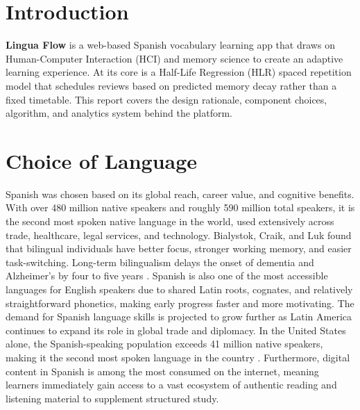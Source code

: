 \documentclass[10pt,a4paper]{article}
\begin{document}
\newpage
\tableofcontents
\newpage

\section{Introduction}
\textbf{Lingua Flow} is a web-based Spanish vocabulary learning app that draws on Human-Computer Interaction (HCI) and memory science to create an adaptive learning experience. At its core is a Half-Life Regression (HLR) spaced repetition model that schedules reviews based on predicted memory decay rather than a fixed timetable. This report covers the design rationale, component choices, algorithm, and analytics system behind the platform.

\section{Choice of Language}
Spanish was chosen based on its global reach, career value, and cognitive benefits. With over 480 million native speakers and roughly 590 million total speakers, it is the second most spoken native language in the world, used extensively across trade, healthcare, legal services, and technology. Bialystok, Craik, and Luk \cite{bialystok2012bilingualism} found that bilingual individuals have better focus, stronger working memory, and easier task-switching. Long-term bilingualism delays the onset of dementia and Alzheimer's by four to five years \cite{marian2012cognitive}. Spanish is also one of the most accessible languages for English speakers due to shared Latin roots, cognates, and relatively straightforward phonetics, making early progress faster and more motivating. The demand for Spanish language skills is projected to grow further as Latin America continues to expand its role in global trade and diplomacy. In the United States alone, the Spanish-speaking population exceeds 41 million native speakers, making it the second most spoken language in the country \cite{marian2012cognitive}. Furthermore, digital content in Spanish is among the most consumed on the internet, meaning learners immediately gain access to a vast ecosystem of authentic reading and listening material to supplement structured study.
\end{document}
